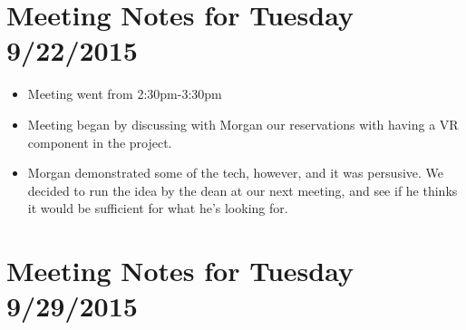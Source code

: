 \documentclass[]{article}
\begin{document}
\section{Meeting Notes for Tuesday 9/22/2015}
	\begin{itemize}
		\item Meeting went from 2:30pm-3:30pm
	\end{itemize}
	\begin{itemize}
		\item Meeting began by discussing with Morgan our reservations with having a VR component in the project. 
		\item Morgan demonstrated some of the tech, however, and it was persusive. We decided to run the idea by 
		the dean at our next meeting, and see if he thinks it would be sufficient for what he's looking for. 
	\end{itemize}
	
\section{Meeting Notes for Tuesday 9/29/2015}
	\item 
\end{document}
